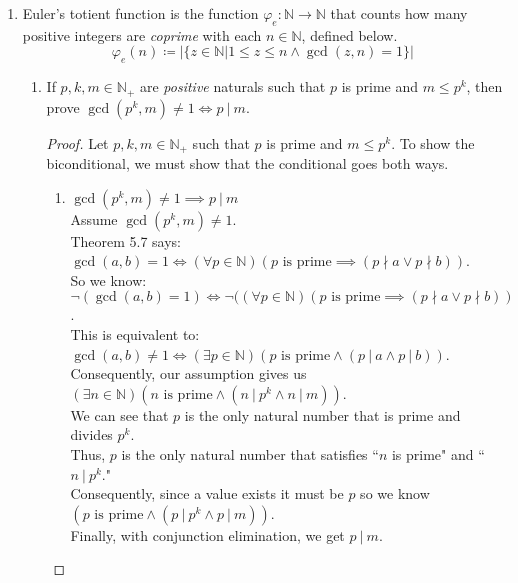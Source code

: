 \documentclass{article}
\newcommand{\defeq}{\coloneqq}
\newcommand{\naturals}{\mathbb{N}}
\newcommand{\divides}{\:\mathbb{|}\: }
\newcommand{\notdivides}{\nmid}
\newcommand{\id}{\texttt{id}}
\begin{document}
\begin{enumerate}
\begin{enumerate}
\begin{proof}
\begin{multicols}{2}
\begin{align*}
            \end{align*}
            Since $b$ was arbitrary, $f \circ g= \id_Y$.
            \end{multicols}
            Consequently, we have shown that there is a well-defined function $g: Y \to X$ such that $g \circ f = \id_X$ and $f \circ g = \id_Y$.
        \end{proof}
    \end{enumerate}
\pagebreak
\item
    Euler's totient function is the function $\varphi_e: \naturals \to \naturals$ that counts how many positive integers are \emph{coprime} with each $n \in \naturals$, defined below.
    \begin{equation*}
      \varphi_e(n)
      \defeq |\{z \in \naturals | 1 \leq z \leq n \land \gcd(z, n) = 1\}|
    \end{equation*}
    \begin{enumerate}
      \item
        If $p, k, m \in \naturals_+$ are \emph{positive} naturals such that $p$ is prime and $m \leq p^k$, then prove $\gcd(p^k, m) \neq 1 \iff p \divides m$.
        \begin{proof}
            Let $p, k, m \in \naturals_+$ such that $p$ is prime and $m \leq p^k.$ To show the biconditional, we must show that the conditional goes both ways.
            \begin{enumerate}
                \item []$\gcd(p^k, m) \neq 1 \implies p \divides m$\\
                Assume $\gcd(p^k, m) \neq 1$.\\ 
                Theorem 5.7 says: $\gcd(a,b)=1 \iff (\forall p \in \naturals)(p \text{ is prime} \implies (p \notdivides a \lor p \notdivides b))$.\\ 
                So we know: $\neg (\gcd(a,b)=1) \iff \neg ((\forall p \in \naturals)(p \text{ is prime} \implies (p \notdivides a \lor p \notdivides b))$.\\
                This is equivalent to: $\gcd(a,b) \neq 1 \iff (\exists p \in \naturals)(p \text{ is prime} \land (p \divides a \land p \divides b))$.\\ 
                Consequently, our assumption gives us $(\exists n \in \naturals)(n \text{ is prime} \land (n \divides p^k \land n \divides m))$.\\
                We can see that $p$ is the only natural number that is prime and divides $p^k$.\\
                Thus, $p$ is the only natural number that satisfies ``$n$ is prime" and ``$n \divides p^k$."\\
                Consequently, since a value exists it must be $p$ so we know $(p \text{ is prime} \land (p \divides p^k \land p \divides m))$.\\
                Finally, with conjunction elimination, we get $p \divides m$.\\
                

\end{enumerate}
\end{proof}
\end{enumerate}
\end{enumerate}
\end{document}
